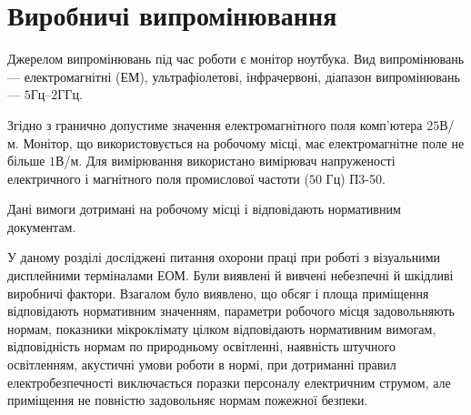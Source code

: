 \section{Виробничі випромінювання}

Джерелом випромінювань під час роботи є монітор ноутбука. 
Вид випромінювань --- електромагнітні (ЕМ), ультрафіолетові, інфрачервоні,
діапазон випромінювань --- $5$Гц–$2$ГГц.

Згідно з \cite{DSN} гранично допустиме значення електромагнітного поля
комп’ютера $25$В/м.
Монітор, що використовується на робочому місці, має електромагнітне поле
не більше $1$В/м.
Для вимірювання використано вимірювач напруженості електричного
і магнітного поля промислової частоти ($50$ Гц) П3-50.

Дані вимоги дотримані на робочому місці і відповідають нормативним документам.

\chapterConclusion

У даному розділі досліджені питання охорони праці при роботі з візуальними
дисплейними терміналами ЕОМ.
Були виявлені й вивчені небезпечні й шкідливі виробничі фактори.
Взагалом було виявлено, що
обсяг і площа приміщення  відповідають нормативним значенням,
параметри робочого місця задовольняють нормам,
показники мікроклімату цілком відповідають нормативним вимогам,
відповідність нормам по природньому освітленні, наявність штучного освітленням,
акустичні умови роботи в нормі,
при дотриманні правил електробезпечності виключається поразки персоналу
електричним струмом,
але приміщення не повністю задовольняє нормам пожежної безпеки.
